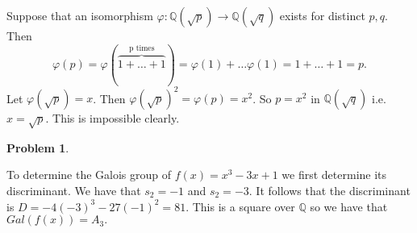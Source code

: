 \documentclass[12pt, a4paper]{article}
\newtheorem{problem}{Problem}
\theoremstyle{definition}
\newcommand{\Q}{\mathbb{Q}}                           %
\begin{document}
Suppose that an isomorphism $\varphi: \Q(\sqrt{p}) \to \Q(\sqrt{q})$ exists for distinct $p,q$. Then $$\varphi(p) = \varphi( \overbrace{1+\dots + 1}^{\text{p times}}) = \varphi(1)+ \dots \varphi(1) = 1+ \dots + 1 = p.$$ Let $\varphi(\sqrt{p}) = x$. Then $\varphi(\sqrt{p})^2 = \varphi(p) = x^2$. So $p = x^2$ in $\Q(\sqrt{q})$ i.e. $x = \sqrt{p}$. This is impossible clearly. 
\newpage 
\begin{problem}
\end{problem}
To determine the Galois group of $f(x) = x^3-3x+1$ we first determine its discriminant. We have that $s_2 = -1$ and $s_2 = -3$.  It follows that the discriminant is $D = -4(-3)^3-27(-1)^2 = 81$. This is a square over $\Q$ so we have that $Gal(f(x)) = A_3. $
\end{document}
